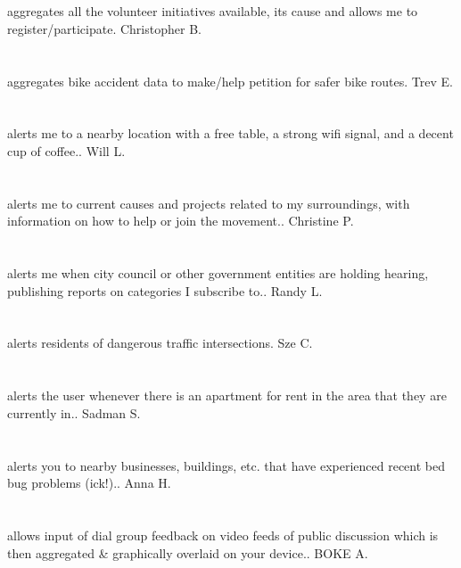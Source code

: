 \section{}aggregates all the volunteer initiatives available,  its cause and allows me to register/participate. Christopher B.
\section{}aggregates bike accident data to make/help petition for safer bike routes. Trev E.
\section{} alerts me to a nearby location with a free table,  a strong wifi signal,  and a decent cup of coffee.. Will L.
\section{} alerts me to current causes and projects related to my surroundings,  with information on how to help or join the movement.. Christine P.
\section{} alerts me when city council or other government entities are holding hearing,  publishing reports on categories I subscribe to.. Randy L.
\section{}alerts residents of dangerous traffic intersections. Sze C.
\section{} alerts the user whenever there is an apartment for rent in the area that they are currently in.. Sadman S.
\section{}  alerts you to nearby businesses,  buildings,  etc. that have experienced recent bed bug problems (ick!).. Anna H.
\section{}allows  input of  dial group feedback on video feeds of public discussion which is then aggregated \& graphically overlaid  on your device.. BOKE A.
